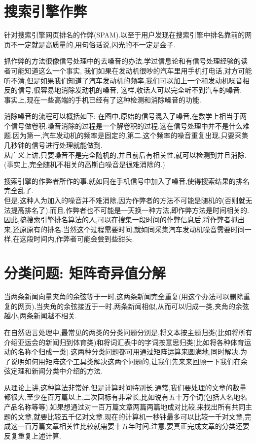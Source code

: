 \documentclass{article}
\begin{document}
\section{搜索引擎作弊}
针对搜索引擎网页排名的作弊(SPAM).以至于用户发现在搜索引擎中排名靠前的网页不一定就是高质量的,用句俗话说,闪光的不一定是金子.

抓作弊的方法很像信号处理中的去噪音的办法.学过信息论和有信号处理经验的读者可能知道这么一个事实,
我们如果在发动机很吵的汽车里用手机打电话,对方可能听不清,但是如果我们知道了汽车发动机的频率,我们可以加上一个和发动机噪音相反的信号,很容易地消除发动机的噪音,
这样,收话人可以完全听不到汽车的噪音.\\
事实上,现在一些高端的手机已经有了这种检测和消除噪音的功能.

消除噪音的流程可以概括如下: 在图中,原始的信号混入了噪音,在数学上相当于两个信号做卷积.噪音消除的过程是一个解卷积的过程.这在信号处理中并不是什么难题.因为第一,汽车发动机的频率是固定的,第二,这个频率的噪音重复出现,只要采集几秒钟的信号进行处理就能做到.\\
从广义上讲,只要噪音不是完全随机的,并且前后有相关性,就可以检测到并且消除.(事实上,完全随机不相关的高斯白噪音是很难消除的.) 

搜索引擎的作弊者所作的事,就如同在手机信号中加入了噪音,使得搜索结果的排名完全乱了.\\
但是,这种人为加入的噪音并不难消除,因为作弊者的方法不可能是随机的(否则就无法提高排名了).而且,作弊者也不可能是一天换一种方法,即作弊方法是时间相关的.\\
因此,搞搜索引擎排名算法的人,可以在搜集一段时间的作弊信息后,将作弊者抓出来,还原原有的排名.当然这个过程需要时间,就如同采集汽车发动机噪音需要时间一样,在这段时间内,作弊者可能会尝到些甜头.

\section{分类问题: 矩阵奇异值分解}
当两条新闻向量夹角的余弦等于一时,这两条新闻完全重复(用这个办法可以删除重复的网页),当夹角的余弦接近于一时,两条新闻相似,从而可以归成一类,夹角的余弦越小,两条新闻越不相关.

在自然语言处理中,最常见的两类的分类问题分别是,将文本按主题归类(比如将所有介绍亚运会的新闻归到体育类)和将词汇表中的字词按意思归类(比如将各种体育运动的名称个归成一类).这两种分类问题都可用通过矩阵运算来圆满地,同时解决.为了说明如何用矩阵这个工具类解决这两个问题的,让我们先来来回顾一下我们在余弦定理和新闻分类中介绍的方法.

从理论上讲,这种算法非常好.但是计算时间特别长.通常,我们要处理的文章的数量都很大,至少在百万篇以上,二次回标有非常长,比如说有五十万个词(包括人名地名产品名称等等).如果想通过对一百万篇文章两篇两篇地成对比较,来找出所有共同主题的文章,就要比较五千亿对文章.现在的计算机一秒钟最多可以比较一千对文章,完成这一百万篇文章相关性比较就需要十五年时间.注意,要真正完成文章的分类还要反复重复上述计算.
\end{document}
